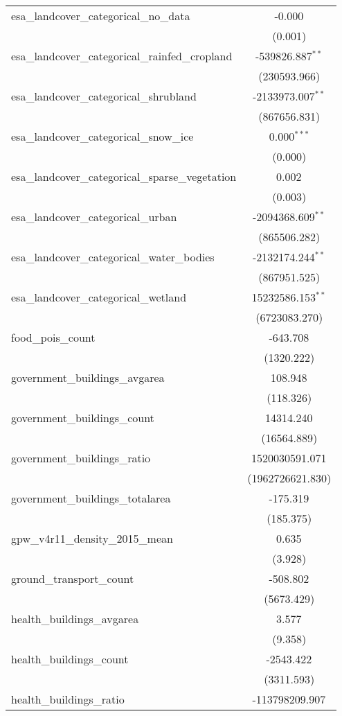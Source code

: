 \begin{table}[!htbp]
\begin{tabular}{@{\extracolsep{5pt}}lc}
 esa_landcover_categorical_no_data & -0.000$^{}$ \\
  & (0.001) \\
 esa_landcover_categorical_rainfed_cropland & -539826.887$^{**}$ \\
  & (230593.966) \\
 esa_landcover_categorical_shrubland & -2133973.007$^{**}$ \\
  & (867656.831) \\
 esa_landcover_categorical_snow_ice & 0.000$^{***}$ \\
  & (0.000) \\
 esa_landcover_categorical_sparse_vegetation & 0.002$^{}$ \\
  & (0.003) \\
 esa_landcover_categorical_urban & -2094368.609$^{**}$ \\
  & (865506.282) \\
 esa_landcover_categorical_water_bodies & -2132174.244$^{**}$ \\
  & (867951.525) \\
 esa_landcover_categorical_wetland & 15232586.153$^{**}$ \\
  & (6723083.270) \\
 food_pois_count & -643.708$^{}$ \\
  & (1320.222) \\
 government_buildings_avgarea & 108.948$^{}$ \\
  & (118.326) \\
 government_buildings_count & 14314.240$^{}$ \\
  & (16564.889) \\
 government_buildings_ratio & 1520030591.071$^{}$ \\
  & (1962726621.830) \\
 government_buildings_totalarea & -175.319$^{}$ \\
  & (185.375) \\
 gpw_v4r11_density_2015_mean & 0.635$^{}$ \\
  & (3.928) \\
 ground_transport_count & -508.802$^{}$ \\
  & (5673.429) \\
 health_buildings_avgarea & 3.577$^{}$ \\
  & (9.358) \\
 health_buildings_count & -2543.422$^{}$ \\
  & (3311.593) \\
 health_buildings_ratio & -113798209.907$^{}$ \\

\end{tabular}
\end{table}
